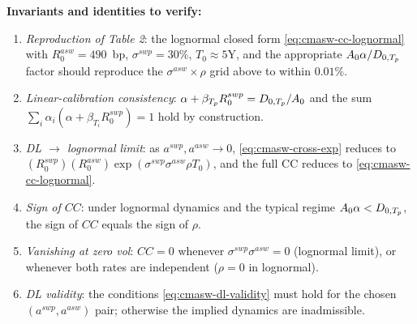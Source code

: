 \documentclass[11pt,a4paper]{article}
\begin{document}
\begin{validation}
\textbf{Invariants and identities to verify:}
\begin{enumerate}[noitemsep]
  \item \emph{Reproduction of Table 2}: the lognormal closed form
        \eqref{eq:cmasw-cc-lognormal} with $R^{asw}_0 = 490$~bp,
        $\sigma^{swp} = 30\%$, $T_0 \approx 5$Y, and the appropriate
        $A_{0}\alpha/D_{0,T_p}$ factor should reproduce the
        $\sigma^{asw} \times \rho$ grid above to within $0.01\%$.
  \item \emph{Linear-calibration consistency}: $\alpha + \beta_{T_p} R^{swp}_0 = D_{0,T_p}/A_{0}$
        and the sum $\sum_{i} \alpha_i (\alpha + \beta_{T_i} R^{swp}_0) = 1$
        hold by construction.
  \item \emph{DL $\to$ lognormal limit}: as $a^{swp}, a^{asw} \to 0$,
        \eqref{eq:cmasw-cross-exp} reduces to
        $(R^{swp}_0)(R^{asw}_0)\exp(\sigma^{swp}\sigma^{asw}\rho T_0)$,
        and the full CC reduces to \eqref{eq:cmasw-cc-lognormal}.
  \item \emph{Sign of $CC$}: under lognormal dynamics and the typical
        regime $A_{0}\alpha < D_{0,T_p}$, the sign of $CC$
        equals the sign of $\rho$.
  \item \emph{Vanishing at zero vol}: $CC = 0$ whenever
        $\sigma^{swp} \sigma^{asw} = 0$ (lognormal limit), or
        whenever both rates are independent ($\rho = 0$ in lognormal).
  \item \emph{DL validity}: the conditions \eqref{eq:cmasw-dl-validity}
        must hold for the chosen $(a^{swp}, a^{asw})$ pair; otherwise
        the implied dynamics are inadmissible.
\end{enumerate}
\end{validation}

\end{document}
